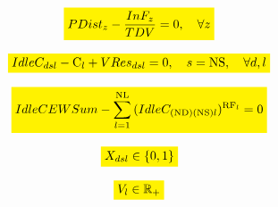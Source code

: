 \documentclass{singlecol}
\newcommand{\mathcolorbox}[2]{\colorbox{#1}{$\displaystyle #2$}}
\theoremstyle{TH}{
\newtheorem{lemma}{Lemma}
\newtheorem{theorem}[lemma]{Theorem}
\newtheorem{corrolary}[lemma]{Corrolary}
\newtheorem{conjecture}[lemma]{Conjecture}
\newtheorem{proposition}[lemma]{Proposition}
\newtheorem{claim}[lemma]{Claim}
\newtheorem{stheorem}[lemma]{Wrong Theorem}
\newtheorem{algorithm}{Algorithm}
}
\theoremstyle{THrm}{
\newtheorem{definition}{Definition}[section]
\newtheorem{question}{Question}[section]
\newtheorem{remark}{Remark}
\newtheorem{scheme}{Scheme}
}
\theoremstyle{THhit}{
\newtheorem{case}{Case}[section]
}
\begin{document}
\begin{equation}
	\mathcolorbox{yellow}{PDist_{z} - \dfrac{InF_{z}}{TDV} = 0, \quad \forall z}
	\label{eq:evalPDist}
\end{equation}

\begin{equation}
	\mathcolorbox{yellow}{IdleC_{dsl} - \mathrm{C}_{l} + VRes_{dsl} = 0, \quad s = \mathrm{NS}, \quad \forall{d, l}}
	\label{eq:evalIdleCap}
\end{equation}

\begin{equation}
	\mathcolorbox{yellow}{IdleCEWSum - \sum_{l=1}^{\mathrm{NL}}{ (IdleC_{({\mathrm{ND}})({\mathrm{NS}})l})^{\mathrm{RF}_l }    } = 0}
	\label{eq:idleCapEWSum}
\end{equation}

\begin{equation}
	\mathcolorbox{yellow}{X_{dsl} \in \{0, 1\}}
	\label{eq:bv}
\end{equation}

\begin{equation}
	\mathcolorbox{yellow}{V_{l} \in \mathbb{R}_+}
	\label{eq:rv}
\end{equation}
\end{document}
